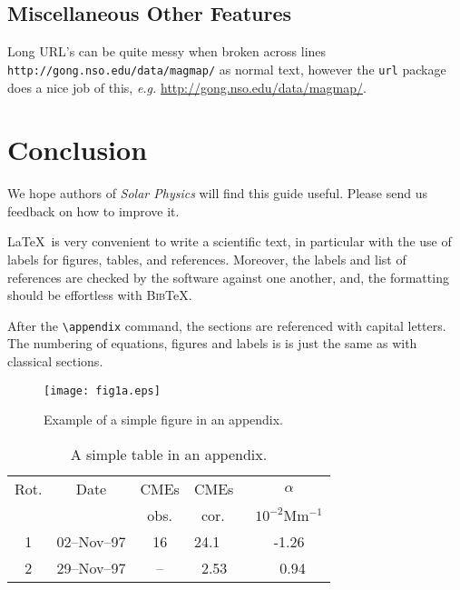 \documentclass[namedreferences]{solarphysics}
\newcommand{\BibTeX}{\textsc{Bib}\TeX}
\begin{document}
\begin{article}
{\subsection{Miscellaneous Other Features} %
      \label{S-Miscellaneous} 
Long URL's can be quite messy when broken across lines
\texttt{ http://gong.nso.edu/data/magmap/} as normal text,
however the \texttt{url} package does a nice job of this, \textit{e.g.} 
\url{http://gong.nso.edu/data/magmap/}.
   
\section{Conclusion} %
      \label{S-Conclusion} 
      We hope authors of {\it Solar Physics} will find this guide useful.
Please send us feedback on how to improve it.
      
  \LaTeX\ is very convenient to write a scientific text, in particular
with the use of labels for figures, tables, and references. Moreover, the labels and list of references are checked by the software against
one another, and, the formatting should be effortless with \BibTeX.

\appendix   

 After the \verb+\appendix+ command, the sections are referenced with 
capital letters. 
The numbering of equations, figures and labels is 
is just the same as with classical sections.

  \begin{figure}    %
   \centerline{\texttt{[image: fig1a.eps]}
              }
   \caption{Example of a simple figure in an appendix.}
    \label{F-appendix}
  \end{figure}

  \begin{table}
   \caption{ A simple table in an appendix. }
   \label{T-appendix}
    \begin{tabular}{ccclc}     %
      \hline                   %
    Rot. & Date & CMEs & CMEs~ & $\alpha$ \\
         &      & obs. & ~cor. & $10^{-2}$Mm$^{-1}$\\
      \hline
    1 & 02--Nov--97 & 16  & 24.1  & -1.26 \\
    2 & 29--Nov--97 & --  & ~2.53 & ~0.94 \\
      \hline
    \end{tabular}
   \end{table}


}
\end{article}
\end{document}
